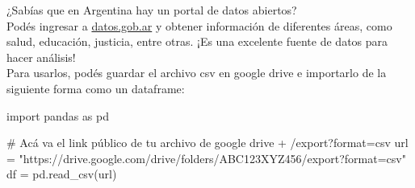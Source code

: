 \documentclass[
  letterpaper,
  DIV=11,
  numbers=noendperiod]{scrreprt}
\newenvironment{Shaded}{\begin{snugshade}}{\end{snugshade}}
\newcommand{\CommentTok}[1]{\textcolor[rgb]{0.37,0.37,0.37}{#1}}
\newcommand{\ImportTok}[1]{\textcolor[rgb]{0.00,0.46,0.62}{#1}}
\newcommand{\NormalTok}[1]{\textcolor[rgb]{0.00,0.23,0.31}{#1}}
\newcommand{\OperatorTok}[1]{\textcolor[rgb]{0.37,0.37,0.37}{#1}}
\newcommand{\StringTok}[1]{\textcolor[rgb]{0.13,0.47,0.30}{#1}}
\begin{document}
\begin{tcolorbox}[enhanced jigsaw, arc=.35mm, toptitle=1mm, colframe=quarto-callout-note-color-frame, bottomtitle=1mm, opacitybacktitle=0.6, colbacktitle=quarto-callout-note-color!10!white, leftrule=.75mm, coltitle=black, toprule=.15mm, titlerule=0mm, title=\textcolor{quarto-callout-note-color}{\faInfo}\hspace{0.5em}{datos.gob.ar}, bottomrule=.15mm, rightrule=.15mm, colback=white, breakable, opacityback=0, left=2mm]

¿Sabías que en Argentina hay un portal de datos abiertos?\\
Podés ingresar a \href{https://www.datos.gob.ar/dataset}{datos.gob.ar} y
obtener información de diferentes áreas, como salud, educación,
justicia, entre otras. ¡Es una excelente fuente de datos para hacer
análisis!\\
Para usarlos, podés guardar el archivo csv en google drive e importarlo
de la siguiente forma como un dataframe:

\begin{Shaded}
\begin{Highlighting}[]
\ImportTok{import}\NormalTok{ pandas }\ImportTok{as}\NormalTok{ pd}

\CommentTok{\# Acá va el link público de tu archivo de google drive + \textquotesingle{}/export?format=csv\textquotesingle{}}
\NormalTok{url }\OperatorTok{=} \StringTok{"https://drive.google.com/drive/folders/ABC123XYZ456/export?format=csv"} 
\NormalTok{df }\OperatorTok{=}\NormalTok{ pd.read\_csv(url)}
\end{Highlighting}
\end{Shaded}

\end{tcolorbox}
\end{document}
